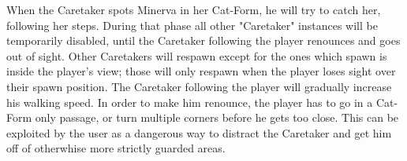 When the Caretaker spots Minerva in her Cat-Form, he will try to catch her, following her steps. During that phase all other "Caretaker" instances will be temporarily disabled, until the Caretaker following the player renounces and goes out of sight. Other Caretakers will respawn except for the ones which spawn is inside the player's view; those will only respawn when the player loses sight over their spawn position. The Caretaker following the player will gradually increase his walking speed. In order to make him renounce, the player has to go in a Cat-Form only passage, or turn multiple corners before he gets too close. This can be exploited by the user as a dangerous way to distract the Caretaker and get him off of otherwhise more strictly guarded areas.